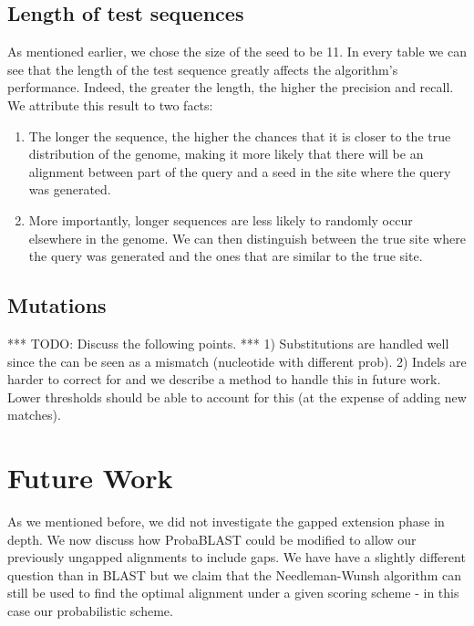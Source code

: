 \documentclass[12pt]{IEEEtran}
\begin{document}
\subsection{Length of test sequences}
As mentioned earlier, we chose the size of the seed to be 11. In every table we can see that the length of the test sequence greatly affects the algorithm's performance. Indeed, the greater the length, the higher the precision and recall. We attribute this result to two facts:
\begin{enumerate}
\item The longer the sequence, the higher the chances that it is closer to the true distribution of the genome, making it more likely that there will be an alignment between part of the query and a seed in the site where the query was generated.
\item More importantly, longer sequences are less likely to randomly occur elsewhere in the genome. We can then distinguish between the true site where the query was generated and the ones that are similar to the true site.
\end{enumerate}


\subsection{Mutations}
*** TODO: Discuss the following points. ***
1) Substitutions are handled well since the can be seen as a mismatch (nucleotide with different prob).
2) Indels are harder to correct for and we describe a method to handle this in future work. Lower thresholds should be able to account for this (at the expense of adding new matches).

\section{Future Work}

As we mentioned before, we did not investigate the gapped extension phase in depth. We now discuss how ProbaBLAST could be modified to allow our previously ungapped alignments to include gaps. We have have a slightly different question than in BLAST but we claim that the Needleman-Wunsh algorithm can still be used to find the optimal alignment under a given scoring scheme - in this case our probabilistic scheme.
\end{document}
